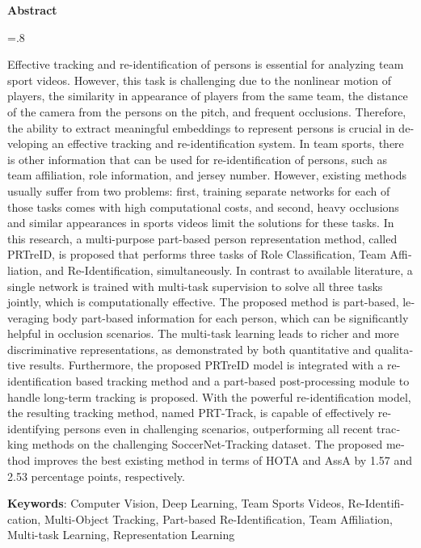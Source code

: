 


\pagestyle{empty}

\begin{latin}

\begin{center}
\textbf{Abstract}
\end{center}
\baselineskip=.8\baselineskip

Effective tracking and re-identification of persons is essential for analyzing team sport videos. However, this task is challenging due to the nonlinear motion of players, the similarity in appearance of players from the same team, the distance of the camera from the persons on the pitch, and frequent occlusions. Therefore, the ability to extract meaningful embeddings to represent persons is crucial in developing an effective tracking and re-identification system. In team sports, there is other information that can be used for re-identification of persons, such as team affiliation, role information, and jersey number. However, existing methods usually suffer from two problems: first, training separate networks for each of those tasks comes with high computational costs, and second, heavy occlusions and similar appearances in sports videos limit the solutions for these tasks.  In this research, a multi-purpose part-based person representation method, called PRTreID, is proposed that performs three tasks of Role Classification, Team Affiliation, and Re-Identification, simultaneously. In contrast to available literature, a single network is trained with multi-task supervision to solve all three tasks jointly, which is computationally effective. The proposed method is part-based, leveraging body part-based information for each person, which can be significantly helpful in occlusion scenarios. The multi-task learning leads to richer and more discriminative representations, as demonstrated by both quantitative and qualitative results. Furthermore, the proposed PRTreID model is integrated with a re-identification based tracking method and a part-based post-processing module to handle long-term tracking is proposed. With the powerful re-identification model, the resulting tracking method, named PRT-Track, is capable of effectively re-identifying persons even in challenging scenarios, outperforming all recent tracking methods on the challenging SoccerNet-Tracking dataset. The proposed method improves the best existing method in terms of HOTA and AssA by 1.57 and 2.53 percentage points, respectively.



\bigskip\noindent\textbf{Keywords}:
Computer Vision, Deep Learning, Team Sports Videos, Re-Identification, Multi-Object Tracking, Part-based Re-Identification, Team Affiliation, Multi-task Learning, Representation Learning
\end{latin}

\newpage
